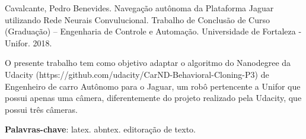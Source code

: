 
Cavalcante, Pedro Benevides. Navegação autônoma da Plataforma Jaguar utilizando Rede Neurais Convulucional. Trabalho de Conclusão de Curso (Graduação) – Engenharia de Controle e Automação. Universidade de Fortaleza - Unifor. 2018.   

O presente trabalho tem como objetivo adaptar o algoritmo do Nanodegree da Udacity 
(https://github.com/udacity/CarND-Behavioral-Cloning-P3) de Engenheiro de carro Autônomo para o Jaguar, um robô pertencente a Unifor que possui apenas uma câmera, diferentemente do projeto realizado pela Udacity, que possui três câmeras. 

\textbf{Palavras-chave}: latex. abntex. editoração de texto.